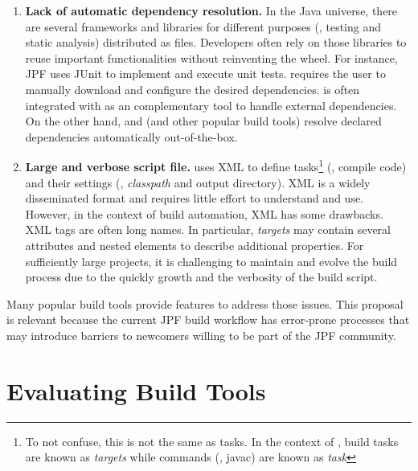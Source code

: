 \documentclass[a4paper, 12pt]{article}
\begin{document}
\begin{enumerate}

\item \textbf{Lack of automatic dependency resolution.}
In the Java universe, there are several frameworks and libraries for different
purposes (\eg, testing and static analysis) distributed as \jar{} files.
Developers often rely on those libraries to reuse important functionalities
without reinventing the wheel.
For instance, JPF uses JUnit to implement and execute unit tests.
\ant{} requires the user to manually download and configure the desired
dependencies.
\ant{} is often integrated with \ivy{}\cite{page:ivy} as an complementary
tool to handle external dependencies.
On the other hand, \gradle{} and \maven{} (and other popular build tools)
resolve declared dependencies automatically out-of-the-box.

\item \textbf{Large and verbose script file.}
\ant{} uses XML to define tasks\footnote{To not confuse, this is not the same
as \ant{} tasks. In the context of \ant{}, build tasks are known as
\emph{targets} while commands (\eg, javac) are known as \emph{task}} (\eg,
compile code) and their settings (\eg, \emph{classpath} and output directory).
XML is a widely disseminated format and requires little effort to understand
and use.
However, in the context of build automation, XML has some drawbacks.
XML tags are often long names.
In particular, \ant{} \emph{targets} may contain several attributes and nested
elements to describe additional properties.
For sufficiently large projects, it is challenging to maintain and evolve the
build process due to the quickly growth and the verbosity of the build script.

\end{enumerate}

Many popular build tools provide features to address those issues.
This proposal is relevant because the current JPF build workflow has error-prone
processes that may introduce barriers to newcomers willing to be part of the
JPF community.

\section{Evaluating Build Tools}
\label{sec:eval}

\end{document}
